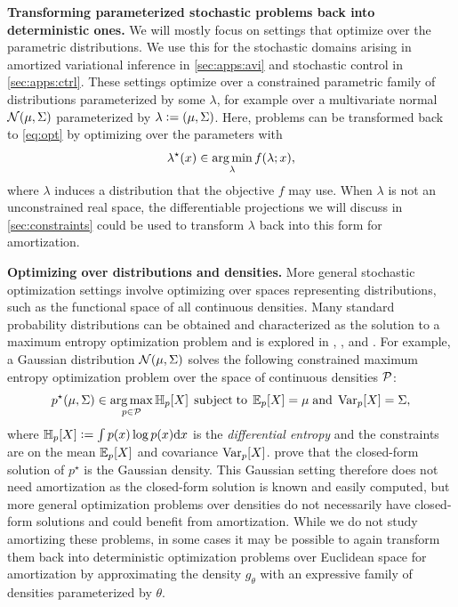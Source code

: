 \documentclass[twoside,11pt]{article}
\begin{document}
\textbf{Transforming parameterized stochastic problems
  back into deterministic ones.}
We will mostly focus on settings that optimize over
the parametric distributions.
We use this for the stochastic domains arising in amortized
variational inference in \cref{sec:apps:avi} and stochastic
control in \cref{sec:apps:ctrl}.
These settings optimize over a constrained parametric family
of distributions parameterized by some $\lambda$, for example
over a multivariate normal ${\mathcal{N}}(\mu, \Sigma)$ parameterized
by $\lambda\vcentcolon= (\mu, \Sigma)$.
Here, problems can be transformed back to \cref{eq:opt} by
optimizing over the parameters with
\begin{equation}
  \lambda^\star(x) \in \operatorname*{arg\,min}_{\lambda} f(\lambda; x),
  \label{eq:normal-opt}
\end{equation}
where $\lambda$ induces a distribution that the
objective $f$ may use.
When $\lambda$ is not an unconstrained real space, the
differentiable projections we will discuss in \cref{sec:constraints}
could be used to transform $\lambda$ back into this form for amortization.

\textbf{Optimizing over distributions and densities.}
More general stochastic optimization settings involve optimizing over
spaces representing distributions, such as the functional space
of all continuous densities.
Many standard probability distributions can be obtained and
characterized as the solution to a maximum entropy
optimization problem and is explored in
\citet[Ch.~12]{cover2006elements},
\citet[p.~47]{guiasu1985principle}, and
\citet[\S6.2]{pennec2006intrinsic}.
For example, a Gaussian distribution ${\mathcal{N}}(\mu, \Sigma)$
solves the following constrained maximum entropy
optimization problem over the space of continuous densities ${\mathcal{P}}$:
\begin{equation}
  p^\star(\mu, \Sigma)\in \operatorname*{arg\,max}_{p\in{\mathcal{P}}} \operatorname{\mathbb{H}}_p[X]\; \operatorname*{subject\;to}\; \operatorname{\mathbb{E}}_p[X] = \mu\; {\rm and}\; \operatorname{\rm{Var}}_p[X] = \Sigma,
  \label{eq:maxent}
\end{equation}
where $\operatorname{\mathbb{H}}_p[X]\vcentcolon=\int p(x)\log p(x){\rm d}x$ is the \emph{differential entropy}
and the constraints are on the mean $\operatorname{\mathbb{E}}_p[X]$ and covariance $\operatorname{\rm{Var}}_p[X]$.
\citet[Theorem~8.6.5]{cover2006elements} prove that the closed-form solution
of $p^\star$ is the Gaussian density.
This Gaussian setting therefore does not need amortization as the
closed-form solution is known and easily computed, but
more general optimization problems over densities do not necessarily
have closed-form solutions and could benefit from amortization.
While we do not study amortizing these problems, in some cases it may
be possible to again transform them back into deterministic optimization problems
over Euclidean space for amortization by approximating the density $g_\theta$
with an expressive family of densities parameterized by $\theta$.
\end{document}
